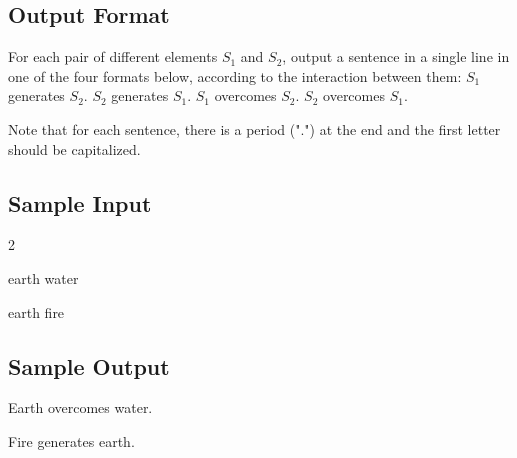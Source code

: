 \subsection{Output Format}

For each pair of different elements $S_1$ and $S_2$, output a sentence in a single line in one of the four formats below, according to the interaction between them:
$S_1$ generates $S_2$.
$S_2$ generates $S_1$.
$S_1$ overcomes $S_2$.
$S_2$ overcomes $S_1$.

Note that for each sentence, there is a period (".") at the end and the first letter should be capitalized.

\subsection{Sample Input}
\begin{data}
2

earth water

earth fire
\end{data}
\subsection{Sample Output}
\begin{data}
Earth overcomes water.

Fire generates earth.
\end{data}

\clearpage{}